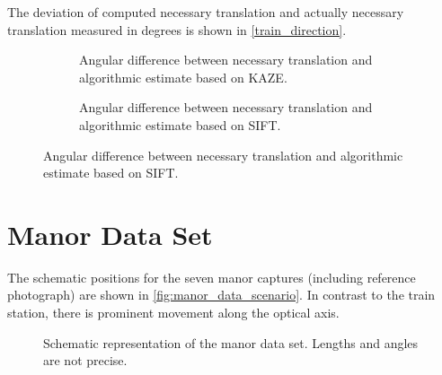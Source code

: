 The deviation of computed necessary translation and actually necessary
translation measured in degrees is shown in \autoref{train_direction}.
\begin{figure}
   \begin{subfigure}{.5\linewidth}
      \centering      
      
      \caption{Angular difference between necessary translation and algorithmic
      estimate based on KAZE.}
      \label{fig:train_KAZE_direction}
   \end{subfigure}
   \begin{subfigure}{.5\linewidth}
      \centering      
      
      \caption{Angular difference between necessary translation and algorithmic
      estimate based on SIFT.}
      \label{fig:train_SIFT_direction}
   \end{subfigure}
   \label{fig:train_direction}
\end{figure}

\FloatBarrier

\section{Manor Data Set}

The schematic positions for the seven manor captures (including reference
photograph) are shown in \autoref{fig:manor_data_scenario}. In contrast to the
train station, there is prominent movement along the optical axis.

\begin{figure}
   {\centering      
      
      \caption{Schematic representation of the manor data set. Lengths and angles are not
      precise.}
   \label{fig:manor_data_scenario}}
\end{figure}

